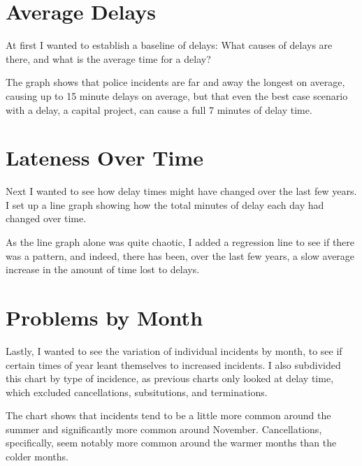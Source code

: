 \documentclass[]{article}
\begin{document}
\vspace{.25cm}


\section{Average Delays}
At first I wanted to establish a baseline of delays: What causes of delays are there, and what is the average time for a delay?



The graph shows that police incidents are far and away the longest on average, causing up to 15 minute delays on average, but that even the best case scenario with a delay, a capital project, can cause a full 7 minutes of delay time.


\section{Lateness Over Time}
Next I wanted to see how delay times might have changed over the last few years. I set up a line graph showing how the total minutes of delay each day had changed over time.


As the line graph alone was quite chaotic, I added a regression line to see if there was a pattern, and indeed, there has been, over the last few years, a slow average increase in the amount of time lost to delays. 


\section{Problems by Month}
Lastly, I wanted to see the variation of individual incidents by month, to see if certain times of year leant themselves to increased incidents. I also subdivided this chart by type of incidence, as previous charts only looked at delay time, which excluded cancellations, subsitutions, and terminations.


The chart shows that incidents tend to be a little more common around the summer and significantly more common around November. Cancellations, specifically, seem notably more common around the warmer months than the colder months.  
\end{document}
